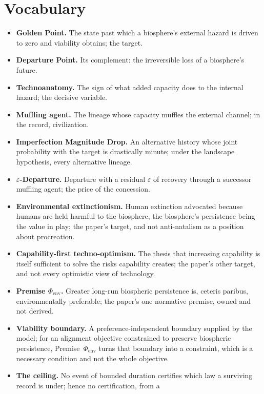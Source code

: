 \section{Vocabulary}\label{sec:vocab}
\begin{itemize}[itemsep=2pt]
\item \textbf{Golden Point.} The state past which a biosphere's external
hazard is driven to zero and viability obtains; the target.
\item \textbf{Departure Point.} Its complement: the irreversible loss of a
biosphere's future.
\item \textbf{Technoanatomy.} The sign of what added capacity does to the
internal hazard; the decisive variable.
\item \textbf{Muffling agent.} The lineage whose capacity muffles the
external channel; in the record, civilization.
\item \textbf{Imperfection Magnitude Drop.} An alternative history whose
joint probability with the target is drastically minute; under the
landscape hypothesis, every alternative lineage.
\item \textbf{$\varepsilon$-Departure.} Departure with a residual
$\varepsilon$ of recovery through a successor muffling agent; the price
of the concession.
\item \textbf{Environmental extinctionism.} Human extinction advocated
because humans are held harmful to the biosphere, the biosphere's
persistence being the value in play; the paper's target, and not
anti-natalism as a position about procreation.
\item \textbf{Capability-first techno-optimism.} The thesis that
increasing capability is itself sufficient to solve the risks
capability creates; the paper's other target, and not every optimistic
view of technology.
\item \textbf{Premise $\Phi_{\mathrm{env}}$.} Greater long-run
biospheric persistence is, ceteris paribus, environmentally preferable;
the paper's one normative premise, owned and not derived.
\item \textbf{Viability boundary.} A preference-independent boundary
supplied by the model; for an alignment objective constrained to
preserve biospheric persistence, Premise~$\Phi_{\mathrm{env}}$ turns
that boundary into a constraint, which is a necessary condition and not
the whole objective.
\item \textbf{The ceiling.} No event of bounded duration certifies which
law a surviving record is under; hence no certification, from a

\end{itemize}
